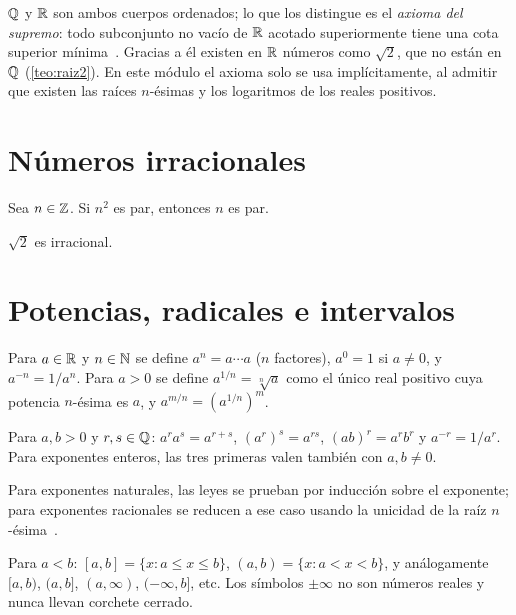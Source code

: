 \begin{observacion}[La completitud]
$\mathbb{Q}$ y $\mathbb{R}$ son ambos cuerpos ordenados; lo que los distingue es el \emph{axioma del supremo}: todo subconjunto no vacío de $\mathbb{R}$ acotado superiormente tiene una cota superior mínima~\cite[cap.~8]{spivak}. Gracias a él existen en $\mathbb{R}$ números como $\sqrt 2$, que no están en $\mathbb{Q}$ (\cref{teo:raiz2}). En este módulo el axioma solo se usa implícitamente, al admitir que existen las raíces $n$-ésimas y los logaritmos de los reales positivos.
\end{observacion}

\section{Números irracionales}

\begin{lema}\label{lem:par}
Sea $n\in\mathbb{Z}$. Si $n^2$ es par, entonces $n$ es par.
\end{lema}

\begin{teorema}\label{teo:raiz2}
$\sqrt2$ es irracional.
\end{teorema}

\section{Potencias, radicales e intervalos}

Para $a\in\mathbb{R}$ y $n\in\mathbb{N}$ se define $a^n=a\cdots a$ ($n$ factores), $a^0=1$ si $a\neq 0$, y $a^{-n}=1/a^n$. Para $a>0$ se define $a^{1/n}=\sqrt[n]{a}$ como el único real positivo cuya potencia $n$-ésima es $a$, y $a^{m/n}=(a^{1/n})^m$.

\begin{proposicion}\label{prop:exponentes}
Para $a,b>0$ y $r,s\in\mathbb{Q}$: $a^{r}a^{s}=a^{r+s}$, $(a^{r})^{s}=a^{rs}$, $(ab)^{r}=a^{r}b^{r}$ y $a^{-r}=1/a^{r}$. Para exponentes enteros, las tres primeras valen también con $a,b\neq 0$.
\end{proposicion}

Para exponentes naturales, las leyes se prueban por inducción sobre el exponente; para exponentes racionales se reducen a ese caso usando la unicidad de la raíz $n$-ésima~\cite[§1.2--1.3]{openstax}.

\begin{definicion}[Intervalos]
Para $a<b$: $[a,b]=\{x: a\le x\le b\}$, $(a,b)=\{x: a<x<b\}$, y análogamente $[a,b)$, $(a,b]$, $(a,\infty)$, $(-\infty,b]$, etc. Los símbolos $\pm\infty$ no son números reales y nunca llevan corchete cerrado.
\end{definicion}

\addtocounter{definicion}{1}%

\addtocounter{definicion}{1}%

